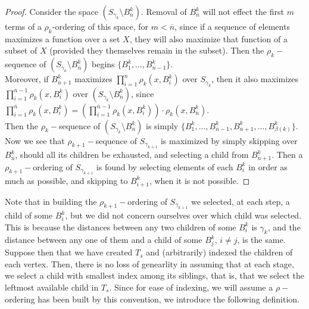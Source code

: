 \begin{proof}
Consider the space $(S_{\gamma_k} \setminus B^k_{\overline{n}})$. Removal of $B^k_{\overline{n}}$ will not effect the first $m$ terms of a $\rho_k$-ordering of this space, for $m < \overline{n}$, since if a sequence of elements maximizes a function over a set $X$, they will also maximize that function of a subset of $X$ (provided they themselves remain in the subset). Then the $\rho_k-$sequence of $(S_{\gamma_k} \setminus B^k_{\overline{n}})$ begins $\{B^k_1,\ldots, B^k_{\overline{n}-1}\}$.\\

Moreover, if $B^k_{\overline{n}+1}$ maximizes $\prod^{\overline{n}}_{i=1} \rho_{k}(x, B^k_i)$ over $S_{\gamma_k}$, then it also maximizes $\prod^{\overline{n}-1}_{i=1} \rho_{k}(x, B^k_i)$ over $(S_{\gamma_k} \setminus B^k_{\overline{n}})$, since $\prod^{\overline{n}}_{i=1} \rho_{k}(x, B^k_i) = (\prod^{\overline{n}-1}_{i=1} \rho_{k}(x, B^k_i)) \cdot \rho_{k}(x, B^k_{\overline{n}})$.\\

Then the $\rho_k-$sequence of  $(S_{\gamma_k}\setminus B^k_{\overline{n}})$ is simply $\{B^k_1,\ldots, B^k_{\overline{n}-1}, B^k_{\overline{n}+1},\ldots, B^k_{\beta(k)}\}$.\\

Now we see that $\rho_{k+1}-$sequence of $S_{\gamma_{k+1}}$ is maximized by simply skipping over $B^k_{\overline{n}}$, should all its children be exhausted, and selecting a child from $B^k_{\overline{n}+1}$. Then a $\rho_{k+1}-$ordering of $S_{\gamma_{k+1}}$ is found by selecting elements of each $B^k_i$ in order as much as possible, and skipping to $B^k_{i+1}$, when it is not possible.

\end{proof}
Note that in building the $\rho_{k+1}-$ordering of $S_{\gamma_{k+1}}$ we selected, at each step, a child of some $B^k_i$, but we did not concern ourselves over which child was selected. This is because the distances between any two children of some $B^k_i$  is $\gamma_k$, and the distance between any one of them and a child of some $B^k_j$, $i \neq j$, is the same. Suppose then that we have created $T_s$ and (arbitrarily) indexed the children of each vertex. Then, there is no loss of genearlity in assuming that at each stage, we select a child with smallest index among its siblings, that is, that we select the leftmost available child in $T_s$. Since for ease of indexing, we will assume a $\rho-$ordering has been built by this convention, we introduce the following definition.

